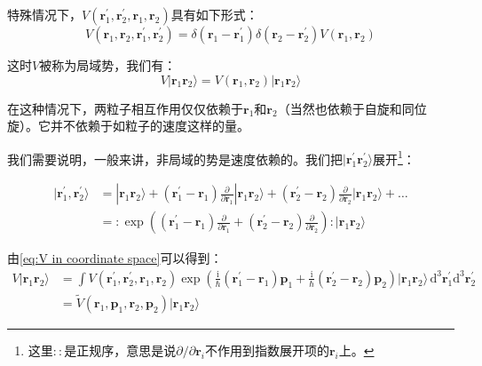 特殊情况下，$V(\boldsymbol{r}^{\prime}_{1},\boldsymbol{r}^{\prime}_{2},\boldsymbol{r}_{1},\boldsymbol{r}_{2})$具有如下形式：
\[
V(\boldsymbol{r}_{1},\boldsymbol{r}_{2},\boldsymbol{r}^{\prime}_{1},\boldsymbol{r}^{\prime}_{2})=\delta(\boldsymbol{r}_{1}-\boldsymbol{r}^{\prime}_{1})\delta(\boldsymbol{r}_{2}-\boldsymbol{r}^{\prime}_{2})V(\boldsymbol{r}_{1},\boldsymbol{r}_{2})
\]

这时$V$被称为局域势，我们有：
\[
V|\boldsymbol{r}_{1}\boldsymbol{r}_{2}\rangle=V(\boldsymbol{r}_{1},\boldsymbol{r}_{2})|\boldsymbol{r}_{1}\boldsymbol{r}_{2}\rangle
\]

在这种情况下，两粒子相互作用仅仅依赖于$\boldsymbol{r}_{1}$和$\boldsymbol{r}_{2}$（当然也依赖于自旋和同位旋）。它并不依赖于如粒子的速度这样的量。

我们需要说明，一般来讲，非局域的势是速度依赖的。我们把$|\boldsymbol{r}^{\prime}_{1}\boldsymbol{r}^{\prime}_{2}\rangle$展开\footnote{这里$:\mathrel{}:$是正规序，意思是说$\partial/\partial\boldsymbol{r}_{i}$不作用到指数展开项的$\boldsymbol{r}_{i}$上。}：

\begin{align*}
|\boldsymbol{r}^{\prime}_{1},\boldsymbol{r}^{\prime}_{2}\rangle & =|\boldsymbol{r}_{1}\boldsymbol{r}_{2}\rangle+(\boldsymbol{r}^{\prime}_{1}-\boldsymbol{r}_{1})\frac{\partial}{\partial\boldsymbol{r}_{1}}|\boldsymbol{r}_{1}\boldsymbol{r}_{2}\rangle+(\boldsymbol{r}^{\prime}_{2}-\boldsymbol{r}_{2})\frac{\partial}{\partial\boldsymbol{r}_{2}}|\boldsymbol{r}_{1}\boldsymbol{r}_{2}\rangle+\dots\\
 & =:\mathrel{\exp\left((\boldsymbol{r}^{\prime}_{1}-\boldsymbol{r}_{1})\frac{\partial}{\partial\boldsymbol{r}_{1}}+(\boldsymbol{r}^{\prime}_{2}-\boldsymbol{r}_{2})\frac{\partial}{\partial\boldsymbol{r}_{2}}\right)}:|\boldsymbol{r}_{1}\boldsymbol{r}_{2}\rangle
\end{align*}

由\ref{eq:V in coordinate space}可以得到：
\begin{align*}
V|\boldsymbol{r}_{1}\boldsymbol{r}_{2}\rangle & =\int V(\boldsymbol{r}^{\prime}_{1},\boldsymbol{r}^{\prime}_{2},\boldsymbol{r}_{1},\boldsymbol{r}_{2})\exp\left(\frac{\mathrm{i}}{\hbar}(\boldsymbol{r}^{\prime}_{1}-\boldsymbol{r}_{1})\boldsymbol{p}_{1}+\frac{\mathrm{i}}{\hbar}(\boldsymbol{r}^{\prime}_{2}-\boldsymbol{r}_{2})\boldsymbol{p}_{2}\right)|\boldsymbol{r}_{1}\boldsymbol{r}_{2}\rangle\,\mathrm{d}^{3}\boldsymbol{r}^{\prime}_{1}\mathrm{d}^{3}\boldsymbol{r}^{\prime}_{2}\\
 & =\tilde{V}(\boldsymbol{r}_{1},\boldsymbol{p}_{1},\boldsymbol{r}_{2},\boldsymbol{p}_{2})|\boldsymbol{r}_{1}\boldsymbol{r}_{2}\rangle
\end{align*}

